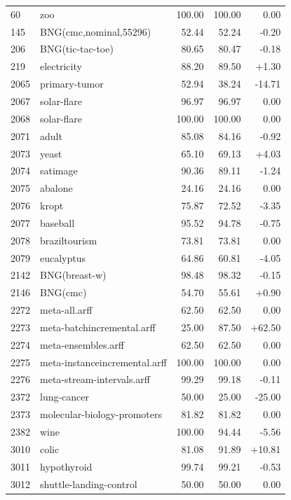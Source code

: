 \documentclass{article}
\begin{document}
\begin{table}[ht]
\begin{tabular}{llrrr}
        60 & zoo & 100.00 & 100.00 & 0.00 \\
        145 & BNG(cmc,nominal,55296) & 52.44 & 52.24 & -0.20 \\
        206 & BNG(tic-tac-toe) & 80.65 & 80.47 & -0.18 \\
        219 & electricity & 88.20 & 89.50 & +1.30 \\
        2065 & primary-tumor & 52.94 & 38.24 & -14.71 \\
        2067 & solar-flare & 96.97 & 96.97 & 0.00 \\
        2068 & solar-flare & 100.00 & 100.00 & 0.00 \\
        2071 & adult & 85.08 & 84.16 & -0.92 \\
        2073 & yeast & 65.10 & 69.13 & +4.03 \\
        2074 & satimage & 90.36 & 89.11 & -1.24 \\
        2075 & abalone & 24.16 & 24.16 & 0.00 \\
        2076 & kropt & 75.87 & 72.52 & -3.35 \\
        2077 & baseball & 95.52 & 94.78 & -0.75 \\
        2078 & braziltourism & 73.81 & 73.81 & 0.00 \\
        2079 & eucalyptus & 64.86 & 60.81 & -4.05 \\
        2142 & BNG(breast-w) & 98.48 & 98.32 & -0.15 \\
        2146 & BNG(cmc) & 54.70 & 55.61 & +0.90 \\
        2272 & meta-all.arff & 62.50 & 62.50 & 0.00 \\
        2273 & meta-batchincremental.arff & 25.00 & 87.50 & +62.50 \\
        2274 & meta-ensembles.arff & 62.50 & 62.50 & 0.00 \\
        2275 & meta-instanceincremental.arff & 100.00 & 100.00 & 0.00 \\
        2276 & meta-stream-intervals.arff & 99.29 & 99.18 & -0.11 \\
        2372 & lung-cancer & 50.00 & 25.00 & -25.00 \\
        2373 & molecular-biology-promoters & 81.82 & 81.82 & 0.00 \\
        2382 & wine & 100.00 & 94.44 & -5.56 \\
        3010 & colic & 81.08 & 91.89 & +10.81 \\
        3011 & hypothyroid & 99.74 & 99.21 & -0.53 \\
        3012 & shuttle-landing-control & 50.00 & 50.00 & 0.00 \\

\end{tabular}
\end{table}
\end{document}
